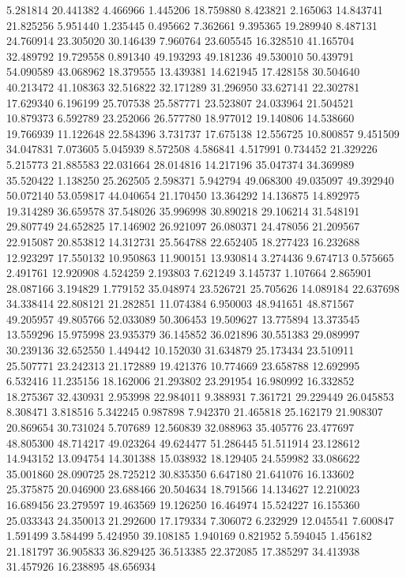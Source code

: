 5.281814
20.441382
4.466966
1.445206
18.759880
8.423821
2.165063
14.843741
21.825256
5.951440
1.235445
0.495662
7.362661
9.395365
19.289940
8.487131
24.760914
23.305020
30.146439
7.960764
23.605545
16.328510
41.165704
32.489792
19.729558
0.891340
49.193293
49.181236
49.530010
50.439791
54.090589
43.068962
18.379555
13.439381
14.621945
17.428158
30.504640
40.213472
41.108363
32.516822
32.171289
31.296950
33.627141
22.302781
17.629340
6.196199
25.707538
25.587771
23.523807
24.033964
21.504521
10.879373
6.592789
23.252066
26.577780
18.977012
19.140806
14.538660
19.766939
11.122648
22.584396
3.731737
17.675138
12.556725
10.800857
9.451509
34.047831
7.073605
5.045939
8.572508
4.586841
4.517991
0.734452
21.329226
5.215773
21.885583
22.031664
28.014816
14.217196
35.047374
34.369989
35.520422
1.138250
25.262505
2.598371
5.942794
49.068300
49.035097
49.392940
50.072140
53.059817
44.040654
21.170450
13.364292
14.136875
14.892975
19.314289
36.659578
37.548026
35.996998
30.890218
29.106214
31.548191
29.807749
24.652825
17.146902
26.921097
26.080371
24.478056
21.209567
22.915087
20.853812
14.312731
25.564788
22.652405
18.277423
16.232688
12.923297
17.550132
10.950863
11.900151
13.930814
3.274436
9.674713
0.575665
2.491761
12.920908
4.524259
2.193803
7.621249
3.145737
1.107664
2.865901
28.087166
3.194829
1.779152
35.048974
23.526721
25.705626
14.089184
22.637698
34.338414
22.808121
21.282851
11.074384
6.950003
48.941651
48.871567
49.205957
49.805766
52.033089
50.306453
19.509627
13.775894
13.373545
13.559296
15.975998
23.935379
36.145852
36.021896
30.551383
29.089997
30.239136
32.652550
1.449442
10.152030
31.634879
25.173434
23.510911
25.507771
23.242313
21.172889
19.421376
10.774669
23.658788
12.692995
6.532416
11.235156
18.162006
21.293802
23.291954
16.980992
16.332852
18.275367
32.430931
2.953998
22.984011
9.388931
7.361721
29.229449
26.045853
8.308471
3.818516
5.342245
0.987898
7.942370
21.465818
25.162179
21.908307
20.869654
30.731024
5.707689
12.560839
32.088963
35.405776
23.477697
48.805300
48.714217
49.023264
49.624477
51.286445
51.511914
23.128612
14.943152
13.094754
14.301388
15.038932
18.129405
24.559982
33.086622
35.001860
28.090725
28.725212
30.835350
6.647180
21.641076
16.133602
25.375875
20.046900
23.688466
20.504634
18.791566
14.134627
12.210023
16.689456
23.279597
19.463569
19.126250
16.464974
15.524227
16.155360
25.033343
24.350013
21.292600
17.179334
7.306072
6.232929
12.045541
7.600847
1.591499
3.584499
5.424950
39.108185
1.940169
0.821952
5.594045
1.456182
21.181797
36.905833
36.829425
36.513385
22.372085
17.385297
34.413938
31.457926
16.238895
48.656934
